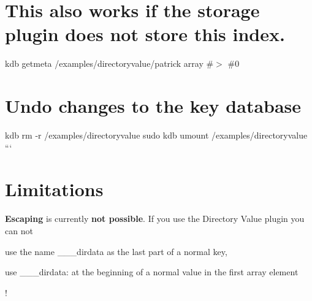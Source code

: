 \section*{This also works if the storage plugin does not store this index.}

kdb getmeta /examples/directoryvalue/patrick array \#$>$ \#0

\section*{Undo changes to the key database}

kdb rm -\/r /examples/directoryvalue sudo kdb umount /examples/directoryvalue ```

\section*{Limitations}

{\bfseries Escaping} is currently {\bfseries not possible}. If you use the Directory Value plugin you can not


\begin{DoxyItemize}
\item use the name {\ttfamily \+\_\+\+\_\+\+\_\+dirdata} as the last part of a normal key,
\item use {\ttfamily \+\_\+\+\_\+\+\_\+dirdata\+:} at the beginning of a normal value in the first array element
\end{DoxyItemize}

! 